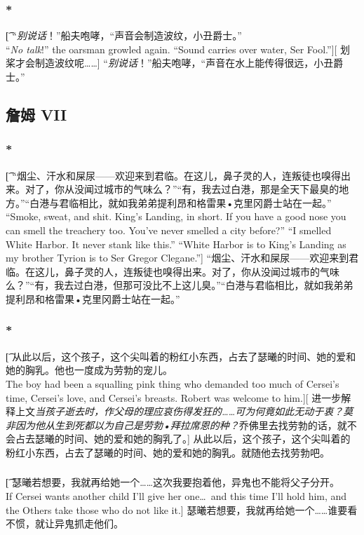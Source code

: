 \documentclass[12pt,a4paper]{article}
\begin{document}
\subsubsection{\color{red}*}\t[
	“\emph{别说话}！”船夫咆哮，“声音会制造波纹，小丑爵士。”\\
	“\emph{No talk}!” the oarsman growled again. “Sound carries over water, Ser Fool.”][
	划桨才会制造波纹呢……]
	“\emph{别说话}！”船夫咆哮，“声音在水上能传得很远，小丑爵士。”
	
\subsection{詹姆 VII}
\subsubsection{\color{red}*}\t[
	“烟尘、汗水和屎尿——欢迎来到君临。在这儿，鼻子灵的人，连叛徒也嗅得出来。对了，你从没闻过城市的气味么？”“有，我去过白港，那是全天下最臭的地方。”“白港与君临相比，就如我弟弟提利昂和格雷果•克里冈爵士站在一起。”\\
	“Smoke, sweat, and shit. King's Landing, in short. If you have a good nose you can smell the treachery too. You've never smelled a city before?” “I smelled White Harbor. It never stank like this.” “White Harbor is to King's Landing as my brother Tyrion is to Ser Gregor Clegane.”]
	“烟尘、汗水和屎尿——欢迎来到君临。在这儿，鼻子灵的人，连叛徒也嗅得出来。对了，你从没闻过城市的气味么？”“有，我去过白港，但那可没比不上这儿臭。”“白港与君临相比，就如我弟弟提利昂和格雷果•克里冈爵士站在一起。”

\subsubsection{\color{red}*}\t[
	从此以后，这个孩子，这个尖叫着的粉红小东西，占去了瑟曦的时间、她的爱和她的胸乳。他也一度成为劳勃的宠儿。\\
	The boy had been a squalling pink thing who demanded too much of Cersei's time, Cersei's love, and Cersei's breasts. Robert was welcome to him.][
	进一步解释上文\emph{当孩子逝去时，作父母的理应哀伤得发狂的……可为何竟如此无动于衷？莫非因为他从生到死都以为自己是劳勃•拜拉席恩的种？}乔佛里去找劳勃的话，就不会占去瑟曦的时间、她的爱和她的胸乳了。]	
	从此以后，这个孩子，这个尖叫着的粉红小东西，占去了瑟曦的时间、她的爱和她的胸乳。就随他去找劳勃吧。
	
\subsubsection{}\t[	
	瑟曦若想要，我就再给她一个……这次我要抱着他，异鬼也不能将父子分开。\\
	If Cersei wants another child I'll give her one\ldots and this time I'll hold him, and the Others take those who do not like it.]
	瑟曦若想要，我就再给她一个……谁要看不惯，就让异鬼抓走他们。
	
\end{document}

